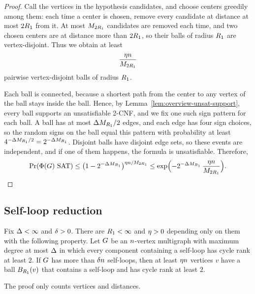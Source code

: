 \begin{proof}
Call the vertices in the hypothesis candidates, and choose centers greedily
among them: each time a center is chosen, remove every candidate at distance at
most \(2R_1\) from it. At most \(M_{2R_1}\) candidates are removed
each time, and two chosen centers are at distance more than \(2R_1\), so
their balls of radius \(R_1\) are vertex-disjoint. Thus we obtain at least
\[
  \frac{\eta n}{M_{2R_1}}
\]
pairwise vertex-disjoint balls of radius \(R_1\).

Each ball is connected, because a shortest path from the center to any vertex of
the ball stays inside the ball. Hence, by
Lemma~\ref{lem:overview-unsat-support}, every ball supports an unsatisfiable
2-CNF, and we fix one such sign pattern for each ball. A ball has at most
\(\Delta M_{R_1}/2\) edges, and each edge has four sign choices, so the
random signs on the ball equal this pattern with probability at least
\(4^{-\Delta M_{R_1}/2}=2^{-\Delta M_{R_1}}\). Disjoint balls have
disjoint edge sets, so these events are independent, and if one of them
happens, the formula is unsatisfiable. Therefore,
\[
  \Prx{\rform{\Gin}\SAT}
  \le\bigl(1-2^{-\degb\ballsz{\radp}}\bigr)^{\pack \nvert/\ballsz{2\radp}}
  \le \exp\Bigl(-2^{-\degb\ballsz{\radp}}\,\frac{\pack \nvert}{\ballsz{2\radp}}\Bigr).
\]
\end{proof}

\subsection{Self-loop reduction}\label{subsec:loop-reduction}

\begin{loopcountingrestatement}
Fix \(\Delta<\infty\) and \(\delta>0\). There are \(R_1<\infty\) and
\(\eta>0\) depending only on them with the following property. Let \(G\) be
an \(n\)-vertex multigraph with maximum degree at most \(\Delta\) in which
every component containing a self-loop has cycle rank at least \(2\). If \(G\)
has more than \(\delta n\) self-loops, then at least \(\eta n\) vertices
\(v\) have a ball \(B_{R_1}(v)\) that contains a self-loop and has cycle
rank at least \(2\).
\end{loopcountingrestatement}

The proof only counts vertices and distances.

